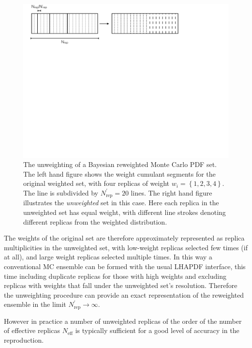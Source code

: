 \begin{figure}[ht!]
\centering
\includegraphics[width=1\textwidth]{4-LHCtools/figs/unweighting.pdf}
\caption[Unweighting of a Bayesian reweighted Monte Carlo PDF set]{The unweighting of a Bayesian reweighted Monte Carlo PDF set. The left hand figure shows the weight cumulant segments for the original weighted set, with four replicas of weight $w_i = \left\{ 1, 2, 3, 4 \right\} $. The line is subdivided by $N_{\text{rep}}^\prime = 20$ lines. The right hand figure illustrates the \emph{unweighted} set in this case. Here each replica in the unweighted set has equal weight, with different line strokes denoting different replicas from the weighted distribution. }
\label{fig:unweighting}
\end{figure}

The weights of the original set are therefore approximately represented as replica multiplicities in the unweighted set, with low-weight replicas selected few times (if at all), and large weight replicas selected multiple times. In this way a conventional MC ensemble can be formed with the usual LHAPDF interface, this time including duplicate replicas for those with high weights and excluding replicas with weights that fall under the unweighted set's resolution. Therefore the unweighting procedure can provide an exact representation of the reweighted ensemble in the limit $N_{\text{rep}}^\prime \to \infty$. 

However in practice a number of unweighted replicas of the order of the number of effective replicas $N_{\text{eff}}$ is typically sufficient for a good level of accuracy in the reproduction.

